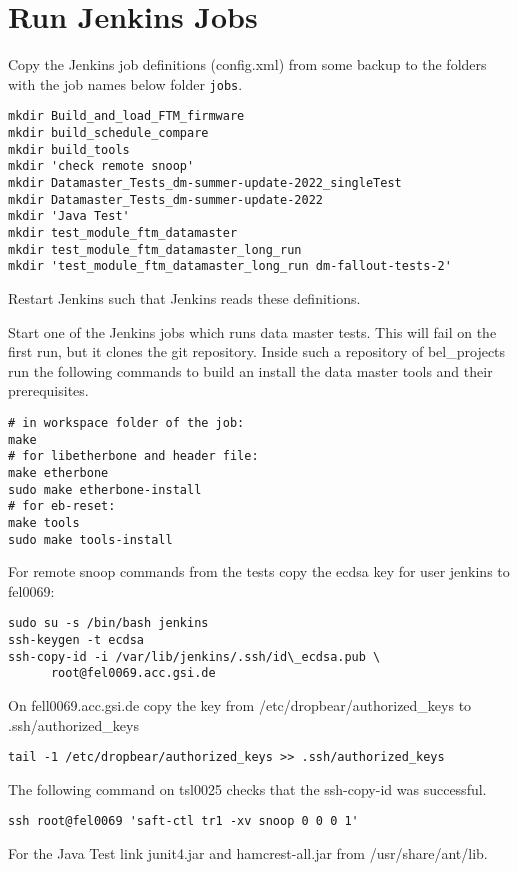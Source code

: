 \documentclass[12pt,a4paper]{report}
\begin{document}
\chapter{Run Jenkins Jobs}
Copy the Jenkins job definitions (config.xml) from some backup to the folders
with the job names below folder \texttt{jobs}.
\begin{verbatim}
mkdir Build_and_load_FTM_firmware
mkdir build_schedule_compare
mkdir build_tools
mkdir 'check remote snoop'
mkdir Datamaster_Tests_dm-summer-update-2022_singleTest
mkdir Datamaster_Tests_dm-summer-update-2022
mkdir 'Java Test'
mkdir test_module_ftm_datamaster
mkdir test_module_ftm_datamaster_long_run
mkdir 'test_module_ftm_datamaster_long_run dm-fallout-tests-2'
\end{verbatim}
Restart Jenkins such that
Jenkins reads these definitions.

Start one of the Jenkins jobs which runs data master tests. This will fail on the first run,
but it clones the git repository. Inside such a repository of bel\_projects run the following
commands to build an install the data master tools and their prerequisites.
\begin{verbatim}
# in workspace folder of the job:
make
# for libetherbone and header file:
make etherbone
sudo make etherbone-install
# for eb-reset:
make tools
sudo make tools-install
\end{verbatim}
For remote snoop commands from the tests copy the ecdsa key for user jenkins to fel0069:
\begin{verbatim}
sudo su -s /bin/bash jenkins
ssh-keygen -t ecdsa
ssh-copy-id -i /var/lib/jenkins/.ssh/id\_ecdsa.pub \
      root@fel0069.acc.gsi.de
\end{verbatim}
On fell0069.acc.gsi.de copy the key from /etc/dropbear/authorized\_keys to .ssh/authorized\_keys
\begin{verbatim}
tail -1 /etc/dropbear/authorized_keys >> .ssh/authorized_keys
\end{verbatim}
The following command on tsl0025 checks that the ssh-copy-id was successful.
\begin{verbatim}
ssh root@fel0069 'saft-ctl tr1 -xv snoop 0 0 0 1'
\end{verbatim}

For the Java Test link junit4.jar and hamcrest-all.jar from /usr/share/ant/lib.
\end{document}
